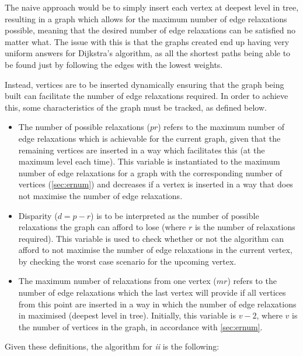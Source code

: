 \documentclass{l4proj}
\begin{document}
The naive approach would be to simply insert each vertex at deepest level in tree, resulting in a graph which allows for the maximum number of edge relaxations possible, meaning that the desired number of edge relaxations can be satisfied no matter what. The issue with this is that the graphs created end up having very uniform answers for Dijkstra's algorithm, as all the shortest paths being able to be found just by following the edges with the lowest weights.

Instead, vertices are to be inserted dynamically ensuring that the graph being built can facilitate the number of edge relaxations required. In order to achieve this, some characteristics of the graph must be tracked, as defined below.

\begin{itemize}
	\item
	The number of possible relaxations ($pr$) refers to the maximum number of edge relaxations which is achievable for the current graph, given that the remaining vertices are inserted in a way which facilitates this (at the maximum level each time). This variable is instantiated to the maximum number of edge relaxations for a graph with the corresponding number of vertices (\autoref{sec:ernum}) and decreases if a vertex is inserted in a way that does not maximise the number of edge relaxations. 
	\item
	Disparity ($d = p - r$) is to be interpreted as the number of possible relaxations the graph can afford to lose (where $r$ is the number of relaxations required). This variable is used to check whether or not the algorithm can afford to not maximise the number of edge relaxations in the current vertex, by checking the worst case scenario for the upcoming vertex.
	\item
	The maximum number of relaxations from one vertex ($mr$) refers to the number of edge relaxations which the last vertex will provide if all vertices from this point are inserted in a way in which the number of edge relaxations in maximised (deepest level in tree). Initially, this variable is $v-2$, where $v$ is the number of vertices in the graph, in accordance with \autoref{sec:ernum}.
\end{itemize}

Given these definitions, the algorithm for \emph{ii} is the following:
\end{document}
